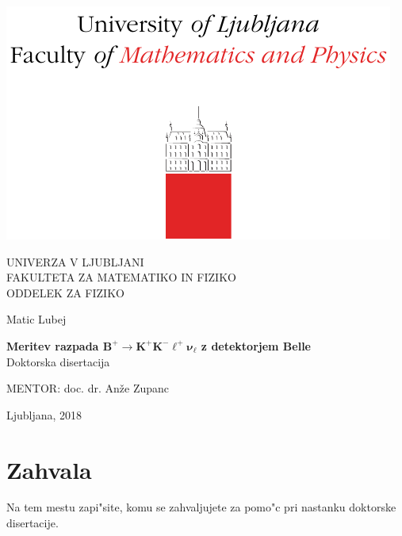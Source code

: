 \cleardoublepage
\begin{otherlanguage}{slovene}
\begin{center}

\includegraphics[trim={0 0 0 2cm},clip]{fig/logo}

{\large UNIVERZA V LJUBLJANI\\
FAKULTETA ZA MATEMATIKO IN FIZIKO\\
ODDELEK ZA FIZIKO\\}

\vspace{5cm}

{\Large Matic Lubej\\}

\vspace{10mm}

{\bf \Large Meritev razpada $\bm{B^+ \to K^+K^-\ell^+\nu_\ell}$ z detektorjem Belle\\}
\vspace{5mm}
{\large Doktorska disertacija}\\

\vfill

{\large MENTOR: doc. dr. An\v ze Zupanc\\
}



\vspace{2cm}

{\large Ljubljana, 2018}

\end{center}



\cleardoublepage

\pagestyle{plain}
\vfill
\chapter*{Zahvala}
Na tem mestu zapi"site, komu se zahvaljujete za pomo"c 
pri nastanku doktorske disertacije.
\pagestyle{empty}


\end{otherlanguage}
